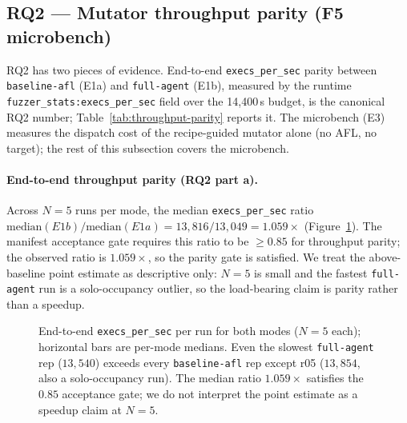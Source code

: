 \documentclass[11pt]{article}
\begin{document}
\subsection{RQ2 --- Mutator throughput parity (F5 microbench)}
\label{sec:eval:rq2}

RQ2 has two pieces of evidence. End-to-end \texttt{execs\_per\_sec}
parity between \texttt{baseline-afl} (E1a) and \texttt{full-agent}
(E1b), measured by the runtime
\texttt{fuzzer\_stats:execs\_per\_sec} field over the 14{,}400\,s
budget, is the canonical RQ2 number; Table~\ref{tab:throughput-parity}
reports it. The microbench (E3) measures the dispatch cost of the
recipe-guided mutator alone (no AFL, no target); the rest of this
subsection covers the microbench.

\paragraph{End-to-end throughput parity (RQ2 part a).}
Across $N{=}5$ runs per mode, the median
\texttt{execs\_per\_sec} ratio
$\textrm{median}(E1b) / \textrm{median}(E1a) = 13{,}816 / 13{,}049
= 1.059\times$ (Figure~\ref{fig:throughput-dot}). The manifest
acceptance gate requires this ratio to be $\geq 0.85$ for
throughput parity; the observed ratio is $1.059\times$, so the
parity gate is satisfied. We treat the above-baseline point estimate
as descriptive only: $N{=}5$ is small and the fastest
\texttt{full-agent} run is a solo-occupancy outlier, so the
load-bearing claim is parity rather than a speedup.

\begin{figure}[t]
  \centering
  
  \caption{End-to-end \texttt{execs\_per\_sec} per run for both
  modes ($N{=}5$ each); horizontal bars are per-mode medians.
  Even the slowest \texttt{full-agent} rep ($13{,}540$) exceeds
  every \texttt{baseline-afl} rep except r05 ($13{,}854$, also a
  solo-occupancy run). The median ratio $1.059\times$ satisfies the
  $0.85$ acceptance gate; we do not interpret the point estimate as a
  speedup claim at $N{=}5$.}
  \label{fig:throughput-dot}
\end{figure}
\end{document}
